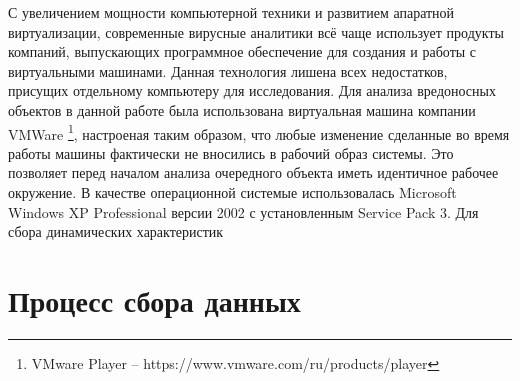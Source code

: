 С увеличением мощности компьютерной техники и развитием апаратной виртуализации, современные вирусные аналитики всё чаще использует продукты компаний, выпускающих программное обеспечение для создания и работы с виртуальными машинами. 
Данная технология лишена всех недостатков, присущих отдельному компьютеру для исследования.
Для анализа вредоносных объектов в данной работе была использована виртуальная машина компании VMWare \footnote{VMware Player -- https://www.vmware.com/ru/products/player}, настроеная таким образом, что любые изменение сделанные во время работы машины фактически не вносились в рабочий образ системы.
Это позволяет перед началом анализа очередного объекта иметь идентичное рабочее окружение.
В качестве операционной системые использовалась Microsoft Windows XP Professional версии 2002 с установленным Service Pack 3.
Для сбора динамических характеристик 

\section{Процесс сбора данных}

